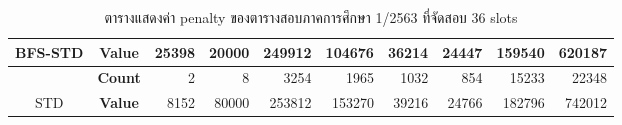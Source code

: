 \begin{table}[]
{\begin{tabular}{@{}ccrrrrrrrr@{}}
    \multirow{-2}{*}{BFS-STD}                    & \textbf{Value}                        & 25398                          & 20000                          & 249912                         & 104676                         & 36214                          & 24447                          & 159540                         & 620187                           \\ \midrule
                                                  & {\textbf{Count}} & {2}       & {8}       & {3254}    & {1965}    & {1032}    & {854}     & {15233}   & {22348}     \\ \cmidrule(l){2-10} 
    \multirow{-2}{*}{STD} & {\textbf{Value}} & {8152}    & {80000}   & {253812}  & {153270}  & {39216}   & {24766}   & {182796}  & {742012}    \\ \bottomrule
    \end{tabular}%
    }
    \caption{ตารางแสดงค่า penalty ของตารางสอบภาคการศึกษา 1/2563 ที่จัดสอบ 36 slots}
    \label{tab:result_table_163_36}
\end{table}
